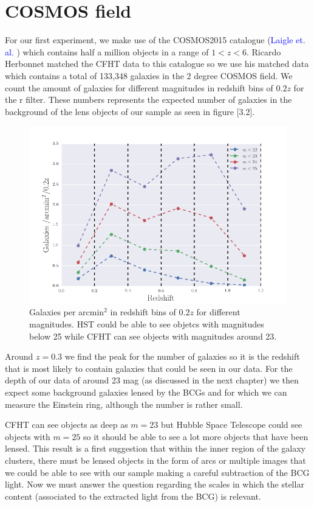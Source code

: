 \section{COSMOS field}

For our first experiment, we make use of the COSMOS2015 catalogue (\textcolor{blue}{Laigle et. al.} \citeyear{Reference21}) which contains half a million objects in a range of $1<z<6$. Ricardo Herbonnet matched the CFHT data to this catalogue so we use his matched data which contains a total of 133,348 galaxies in the 2 degree COSMOS field. We count the amount of galaxies for different magnitudes in redshift bins of $0.2z$ for the r filter. These numbers represents the expected number of galaxies in the background of the lens objects of our sample as seen in figure [3.2]. 

\begin{figure}[H]
\centering
\includegraphics[width=12cm]{images/galaxies_per_arcmin.png}
\caption[Galaxies per arcmin]{Galaxies per arcmin$^2$ in redshift bins of $0.2z$ for different magnitudes. HST could be able to see objetcs with magnitudes below 25 while CFHT can see objects with magnitudes around 23.}
\end{figure}

Around $z=0.3$ we find the peak for the number of galaxies so it is the redshift that is most likely to contain galaxies that could be seen in our data. For the depth of our data of around 23 mag (as discussed in the next chapter) we then expect some background galaxies lensed by the BCGs and for which we can measure the Einstein ring, although the number is rather small. 

CFHT can see objects as deep as $m=23$ but Hubble Space Telescope could see objects with $m=25$ so it should be able to see a lot more objects that have been lensed. This result is a first suggestion that within the inner region of the galaxy clusters, there must be lensed objects in the form of arcs or multiple images that we could be able to see with our sample making a careful subtraction of the BCG light. Now we must answer the question regarding the scales in which the stellar content (associated to the extracted light from the BCG) is relevant.

